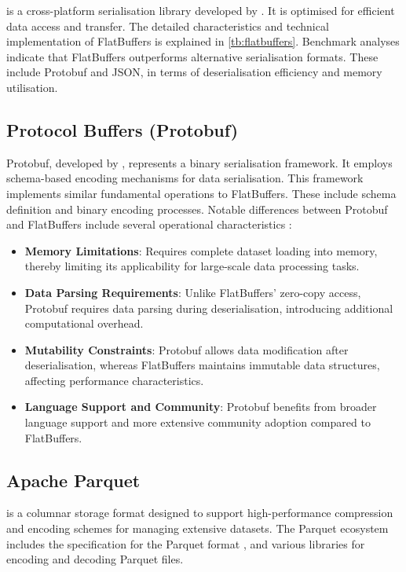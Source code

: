 \citet{flatbuffers} is a cross-platform serialisation library developed by \citet{google_flatbuffers}.
It is optimised for efficient data access and transfer.
The detailed characteristics and technical implementation of FlatBuffers is explained in \autoref{tb:flatbuffers}.
Benchmark analyses \citep{flatbuffers_benchmark} indicate that FlatBuffers outperforms alternative serialisation formats.
These include Protobuf \citep{protobuf} and JSON, in terms of deserialisation efficiency and memory utilisation.

\subsection{Protocol Buffers (Protobuf)}
\label{rw:non_geospatial_formats:protobuf}

Protobuf, developed by \citet{protobuf}, represents a binary serialisation framework.
It employs schema-based encoding mechanisms for data serialisation.
This framework implements similar fundamental operations to FlatBuffers.
These include schema definition and binary encoding processes.
Notable differences between Protobuf and FlatBuffers include several operational characteristics \citep{protobuf}:
\begin{itemize}
  \item \textbf{Memory Limitations}: Requires complete dataset loading into memory, thereby limiting its applicability for large-scale data processing tasks.
  \item \textbf{Data Parsing Requirements}: Unlike FlatBuffers' zero-copy access, Protobuf requires data parsing during deserialisation, introducing additional computational overhead.
  \item \textbf{Mutability Constraints}: Protobuf allows data modification after deserialisation, whereas FlatBuffers maintains immutable data structures, affecting performance characteristics.
  \item \textbf{Language Support and Community}: Protobuf benefits from broader language support and more extensive community adoption compared to FlatBuffers.
\end{itemize}

\subsection{Apache Parquet}
\label{rw:non_geospatial_formats:parquet}

\citet{parquet} is a columnar storage format designed to support high-performance compression and encoding schemes for managing extensive datasets.
The Parquet ecosystem includes the specification for the Parquet format \citep{parquet-format}, and various libraries for encoding and decoding Parquet files.

